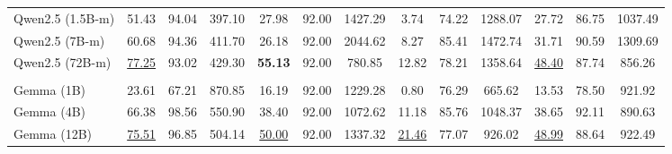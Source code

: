 \begin{table}
\begin{adjustbox}{width=\textwidth}
\begin{tabulary}{1.3\textwidth}{LCCCCCCCCCCCC}
Qwen2.5 (1.5B-m) & 51.43 & 94.04 & 397.10 & 27.98 & 92.00 & 1427.29 & 3.74 & 74.22 & 1288.07 &  27.72 &  86.75 &  1037.49 \\

Qwen2.5 (7B-m) & 60.68 & 94.36 & 411.70 & 26.18 & 92.00 & 2044.62 & 8.27 & 85.41 & 1472.74 &  31.71 &  90.59 &  1309.69 \\

Qwen2.5 (72B-m) & \underline{77.25} & 93.02 & 429.30 & \textbf{55.13} & 92.00 & 780.85 & 12.82 & 78.21 & 1358.64 &  \underline{48.40} &  87.74 &  856.26 \\
\midrule
{}
 \\
\midrule
Gemma (1B) & 23.61 & 67.21 & 870.85 & 16.19 & 92.00 & 1229.28 & 0.80 & 76.29 & 665.62 &  13.53 &  78.50 &  921.92 \\

Gemma (4B) & 66.38 & 98.56 & 550.90 & 38.40 & 92.00 & 1072.62 & 11.18 & 85.76 & 1048.37 &  38.65 &  92.11 &  890.63 \\

Gemma (12B) & \underline{75.51} & 96.85 & 504.14 & \underline{50.00} & 92.00 & 1337.32 & \underline{21.46} & 77.07 & 926.02 &  \underline{48.99} &  88.64 &  922.49 \\


\end{tabulary}
\end{adjustbox}
\end{table}
